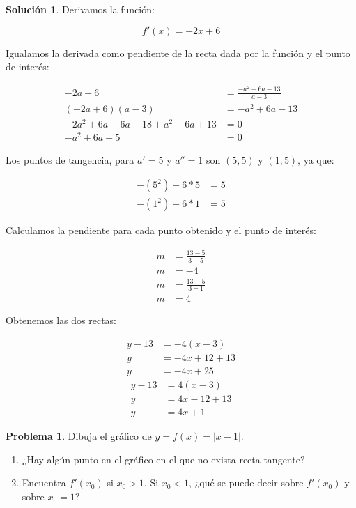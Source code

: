 \documentclass{article}
\theoremstyle{definition}
\newtheorem{problem}{Problema}
\newtheorem*{solution}{Solución}
\begin{document}
\begin{solution}

Derivamos la función:

\[
f'(x) = -2x+6
\]

Igualamos la derivada como pendiente de la recta dada por la función y el punto de interés:

\begin{align*}
    -2a+6 &= \frac{-a^2+6a-13}{a-3} \\
    (-2a+6)(a-3) &= -a^2+6a-13 \\
    -2a^2 + 6a + 6a - 18 + a^2 - 6a + 13 &= 0 \\
    -a^2 + 6a - 5 &= 0
\end{align*}

Los puntos de tangencia, para \(a'=5\) y \(a''=1\) son \( (5, 5) \) y \( (1, 5) \), ya que:

\begin{align*}
    -(5^2)+6*5 &= 5 \\
    -(1^2)+6*1 &= 5
\end{align*}

Calculamos la pendiente para cada punto obtenido y el punto de interés:

\begin{align*}
    m &= \frac{13-5}{3-5} \\
    m &= -4
\end{align*}
\begin{align*}
    m &= \frac{13-5}{3-1} \\
    m &= 4
\end{align*}

Obtenemos las dos rectas:

\begin{align*}
    y - 13 &= -4(x-3) \\
    y &= -4x + 12 + 13 \\
    y &= -4x + 25
\end{align*}
\begin{align*}
    y - 13 &= 4(x-3) \\
    y &= 4x - 12 + 13 \\
    y &= 4x + 1
\end{align*}
\end{solution}

\bigskip

\begin{problem}
Dibuja el gráfico de \( y = f(x) = |x - 1| \).
\begin{enumerate}
    \item ¿Hay algún punto en el gráfico en el que no exista recta tangente?
    \item Encuentra \( f'(x_0) \) si \( x_0 > 1 \).  Si \( x_0 < 1 \), ¿qué se puede decir sobre \( f'(x_0) \) y sobre \( x_0 = 1 \)?
\end{enumerate}
\end{problem}
\end{document}
